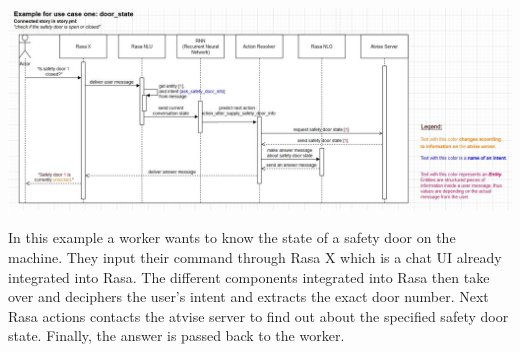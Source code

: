\documentclass[portrait,final,a2paper,fontscale=0.79]{baposter}
\begin{document}
\begin{poster}
{\begin{center}
	\includegraphics[width=1\linewidth]{images/sequence_diagram.jpg}
\end{center}

In this example a worker wants to know the state of a safety door on the machine. 
They input their command through Rasa X which is a chat UI already integrated into Rasa. 
The different components integrated into Rasa then take over and deciphers the user’s intent and extracts the exact door number. 
Next Rasa actions contacts the atvise server to find out about the specified safety door state. 
Finally, the answer is passed back to the worker.

}


\end{poster}
\end{document}
